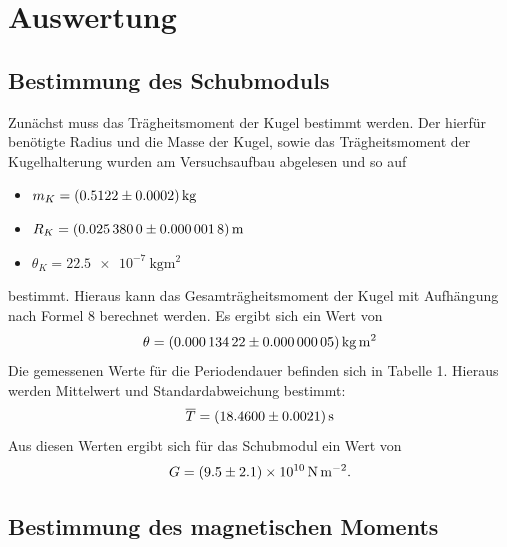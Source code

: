 \documentclass[11pt,ngerman,a4paper]{article}
\begin{document}
\section{Auswertung}

\subsection{Bestimmung des Schubmoduls}
Zunächst muss das Trägheitsmoment der Kugel bestimmt werden. Der hierfür benötigte Radius und die Masse der Kugel, sowie das Trägheitsmoment der Kugelhalterung wurden am Versuchsaufbau abgelesen und so auf
\begin{itemize}
\item $m_K = \SI{0,5122+-0,0002}{\kilo\gram}$
\item $R_K =\SI{0.0253800+-0.0000018}{\metre}$
\item $\theta_K = \SI{22.5e-7}{\kilo\gram\meter\squared}$
\end{itemize}
bestimmt. Hieraus kann das Gesamträgheitsmoment der Kugel mit Aufhängung nach Formel 8 berechnet werden. Es ergibt sich ein Wert von
\[
\theta = \SI{0.00013422+-0.00000005}{\kilo\gram\meter\squared}
\]
Die gemessenen Werte für die Periodendauer befinden sich in Tabelle 1. Hieraus werden Mittelwert und Standardabweichung bestimmt:
\[
\overline{T} = \SI{18.4600+-0.0021}{\second}
\]
Aus diesen Werten ergibt sich für das Schubmodul ein Wert von
\[
G = \SI{9.5+-2.1e+10}{\newton\per\meter\squared}.
\]

\subsection{Bestimmung des magnetischen Moments}
\end{document}

